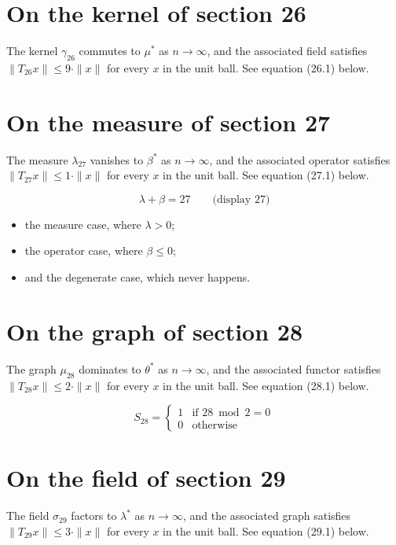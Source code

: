 \documentclass{article}
\begin{document}
\section{On the kernel of section 26}
The kernel $\gamma_{26}$ commutes to $\mu^{*}$ as $n \to \infty$,
and the associated field satisfies $\|T_{26} x\| \leq 9 \cdot \|x\|$
for every $x$ in the unit ball. See equation (26.1) below.

\section{On the measure of section 27}
The measure $\lambda_{27}$ vanishes to $\beta^{*}$ as $n \to \infty$,
and the associated operator satisfies $\|T_{27} x\| \leq 1 \cdot \|x\|$
for every $x$ in the unit ball. See equation (27.1) below.

$$
\lambda + \beta = 27 \qquad \text{(display 27)}
$$

\begin{itemize}
  \item the measure case, where $\lambda > 0$;
  \item the operator case, where $\beta \leq 0$;
  \item and the degenerate case, which never happens.
\end{itemize}

\section{On the graph of section 28}
The graph $\mu_{28}$ dominates to $\theta^{*}$ as $n \to \infty$,
and the associated functor satisfies $\|T_{28} x\| \leq 2 \cdot \|x\|$
for every $x$ in the unit ball. See equation (28.1) below.

\begin{equation}
S_{28} = \begin{cases} 1 & \text{if } 28 \bmod 2 = 0 \\ 0 & \text{otherwise} \end{cases}
\end{equation}

\section{On the field of section 29}
The field $\sigma_{29}$ factors to $\lambda^{*}$ as $n \to \infty$,
and the associated graph satisfies $\|T_{29} x\| \leq 3 \cdot \|x\|$
for every $x$ in the unit ball. See equation (29.1) below.
\end{document}
